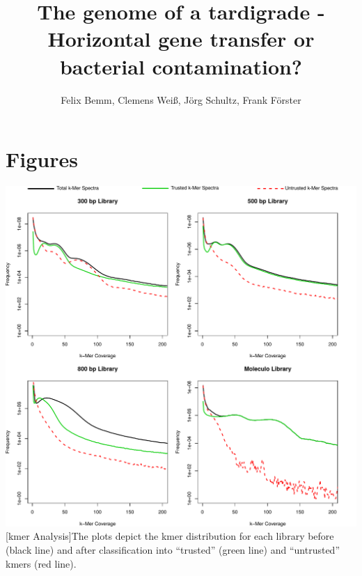 \documentclass[12pt,a4paper]{scrartcl}
\title{\Large The genome of a tardigrade - \\\large Horizontal gene transfer or bacterial contamination?}
\author{\normalsize Felix Bemm, Clemens Weiß, Jörg Schultz, Frank Förster}
\date{}
\begin{document}
\maketitle

\pagebreak

\section{Figures}

\includegraphics[width=1\textwidth]{supplementary_figure_1}
[kmer Analysis]{The plots depict the kmer
  distribution for each library before (black line) and after
  classification into ``trusted'' (green line) and ``untrusted'' kmers
  (red line).}

\pagebreak
\end{document}
